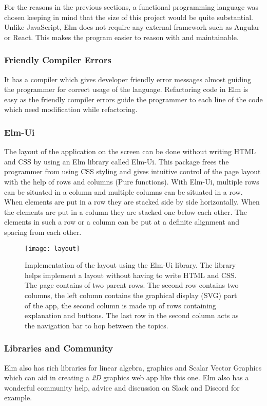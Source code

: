 For the reasons in the previous sections, a functional programming language was
chosen keeping in mind that the size of this project would be quite
substantial.  Unlike JavaScript, Elm does not require any external framework
such as Angular or React. This makes the program easier to reason with and
maintainable.

\subsubsection{Friendly Compiler Errors}
It has a compiler which gives developer friendly error messages almost guiding the
programmer for correct usage of the language. Refactoring code in Elm is easy
as the friendly compiler errors guide the programmer to each line of the code
which need modification while refactoring.

\subsubsection{Elm-Ui}
The layout of the application on the screen can be done without writing HTML and CSS by using an Elm library called Elm-Ui. This package frees the
programmer from using CSS styling and gives intuitive control of the page
layout with the help of rows and columns (Pure functions). With Elm-Ui,
multiple rows can be situated in a column and multiple columns can be situated
in a row. When elements are put in a row they are stacked side
by side horizontally. When the elements are put in a column they are stacked
one below each other. The elements in such a row or a column can be put at a
definite alignment and spacing from each other.

\begin{figure}[!ht]
\centering
\texttt{[image: layout]}
\caption{
         Implementation of the layout using the Elm-Ui library. The library helps implement a layout without having to write HTML and CSS. The page contains of two parent
         rows. The second row contains two columns, the left column contains
         the graphical display (SVG) part of the app, the second column is made up of
         rows containing explanation and buttons. The last row in the second column
         acts as the navigation bar to hop between the topics.
        }
\end{figure}

\subsubsection{Libraries and Community}
Elm also has rich libraries for linear algebra, graphics and Scalar Vector
Graphics which can aid in creating a \emph{2D} graphics web app like this one.
Elm also has a wonderful community help, advice and discussion on Slack and
Discord for example.


